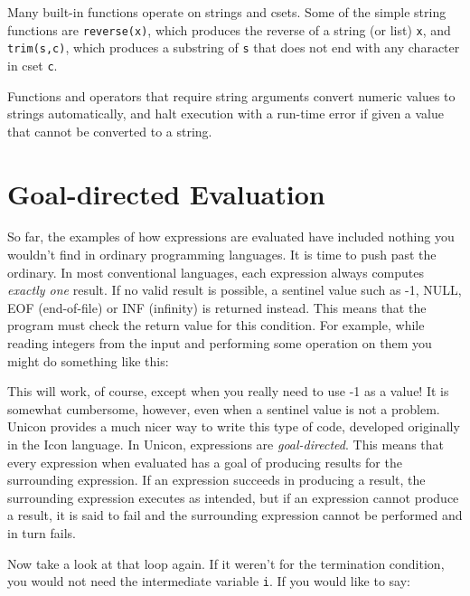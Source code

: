 Many built-in functions operate on strings and csets. Some of the simple
string functions are \texttt{reverse(x)}, which
produces the reverse of a string (or list) \texttt{x}, and
\texttt{trim(s,c)}, which produces a substring of
\texttt{s} that does not end with any character in cset \texttt{c}.

Functions and operators that require string arguments convert numeric
values to strings automatically, and halt execution with a run-time
error if given a value that cannot be converted to a string.

\section{Goal-directed Evaluation}

So far, the examples of how
expressions are evaluated have included nothing you
wouldn't find in ordinary programming languages. It is
time to push past the ordinary.
In most conventional languages, each expression always computes
\textit{exactly one} result. If no valid result is possible, a
sentinel value such as -1, NULL, EOF
(end-of-file) or INF (infinity) is
returned instead. This means that the program must check the return
value for this condition. For example, while reading integers from the
input and performing some operation on them you might do something like
this:


This will work, of course, except when you really need to use -1 as a
value! It is somewhat cumbersome, however, even when a sentinel value
is not a problem. Unicon provides a much nicer way to write this type
of code, developed originally in the Icon language. In Unicon,
expressions are \textit{goal-directed}. This means that every
expression when evaluated has a goal of producing results for the
surrounding expression. If an expression succeeds in producing a
result, the surrounding expression executes as intended, but if an
expression cannot produce a result, it is said to fail and the surrounding expression cannot be performed and in
turn fails.

Now take a look at that loop again. If it weren't for
the termination condition, you would not need the
intermediate variable \texttt{i}. If you would like to say:

